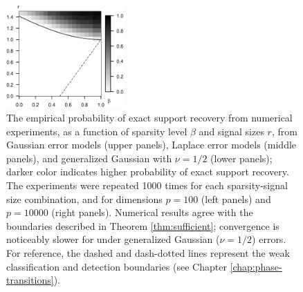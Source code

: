 \begin{figure}
      \includegraphics[width=0.4\textwidth]{./figures/simulated_phase_diagram_NLC_p10000.eps}
      \caption{The empirical probability of exact support recovery from numerical experiments, as a function of sparsity level $\beta$ and signal sizes $r$, from Gaussian error models (upper panels), Laplace error models (middle panels), and generalized Gaussian with $\nu=1/2$ (lower panels); darker color indicates higher probability of exact support recovery. 
      The experiments were repeated 1000 times for each sparsity-signal size combination, and for dimensions $p=100$ (left panels) and $p=10000$ (right panels). Numerical results agree with the boundaries described in Theorem \ref{thm:sufficient}; convergence is noticeably slower for under generalized Gaussian ($\nu=1/2$) errors.
      For reference, the dashed and dash-dotted lines represent the weak classification and detection boundaries (see Chapter \ref{chap:phase-transitions}).}
      \label{fig:phase-simulated}
\end{figure}

